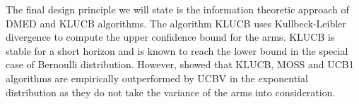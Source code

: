 	The final design principle we will state is the information theoretic approach of  DMED \citep{honda2010asymptotically} and KLUCB \citep{garivier2011kl} algorithms. The algorithm KLUCB uses Kullbeck-Leibler divergence to compute the upper confidence bound for the arms. KLUCB is stable for a short horizon and is known to reach the \citet{lai1985asymptotically} lower bound in the special case of Bernoulli distribution. However, \citet{garivier2011kl} showed that KLUCB, MOSS and UCB1 algorithms are  empirically outperformed by UCBV in the exponential distribution as they do not take the variance of the arms into consideration. 